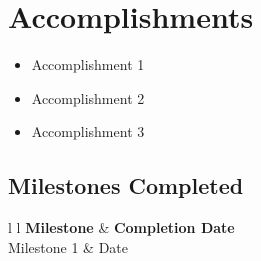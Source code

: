 \section{Accomplishments}


\begin{itemize}
    \item Accomplishment 1
    \item Accomplishment 2
    \item Accomplishment 3
\end{itemize}

\subsection{Milestones Completed}


\begin{wyrdtab}{l l}
\textbf{Milestone} & \textbf{Completion Date} \\
Milestone 1 & Date \\
\end{wyrdtab}
